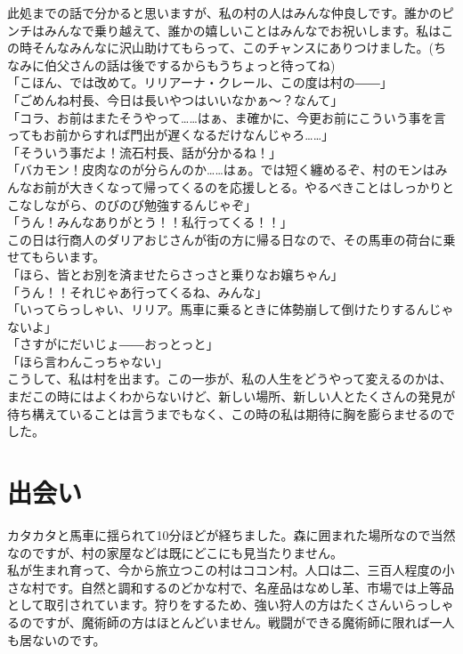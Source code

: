\documentclass[oneside, a4paper]{jsbook}
\begin{document}
此処までの話で分かると思いますが、私の村の人はみんな仲良しです。誰かのピンチはみんなで乗り越えて、誰かの嬉しいことはみんなでお祝いします。私はこの時そんなみんなに沢山助けてもらって、このチャンスにありつけました。(ちなみに伯父さんの話は後でするからもうちょっと待ってね)\\

\noindent
「こほん、では改めて。リリアーナ・クレール、この度は村の――」\\
「ごめんね村長、今日は長いやつはいいなかぁ～？なんて」\\
「コラ、お前はまたそうやって……はぁ、ま確かに、今更お前にこういう事を言ってもお前からすれば門出が遅くなるだけなんじゃろ……」\\
「そういう事だよ！流石村長、話が分かるね！」\\
「バカモン！皮肉なのが分らんのか……はぁ。では短く纏めるぞ、村のモンはみんなお前が大きくなって帰ってくるのを応援しとる。やるべきことはしっかりとこなしながら、のびのび勉強するんじゃぞ」\\
「うん！みんなありがとう！！私行ってくる！！」\\

この日は行商人のダリアおじさんが街の方に帰る日なので、その馬車の荷台に乗せてもらいます。\\

\noindent
「ほら、皆とお別を済ませたらさっさと乗りなお嬢ちゃん」\\
「うん！！それじゃあ行ってくるね、みんな」\\
「いってらっしゃい、リリア。馬車に乗るときに体勢崩して倒けたりするんじゃないよ」\\
「さすがにだいじょ――おっとっと」\\
「ほら言わんこっちゃない」\\

こうして、私は村を出ます。この一歩が、私の人生をどうやって変えるのかは、まだこの時にはよくわからないけど、新しい場所、新しい人とたくさんの発見が待ち構えていることは言うまでもなく、この時の私は期待に胸を膨らませるのでした。

\newpage

\section{出会い}

カタカタと馬車に揺られて10分ほどが経ちました。森に囲まれた場所なので当然なのですが、村の家屋などは既にどこにも見当たりません。\\

私が生まれ育って、今から旅立つこの村はココン村。人口は二、三百人程度の小さな村です。自然と調和するのどかな村で、名産品はなめし革、市場では上等品として取引されています。狩りをするため、強い狩人の方はたくさんいらっしゃるのですが、魔術師の方はほとんどいません。戦闘ができる魔術師に限れば一人も居ないのです。\\
\end{document}
